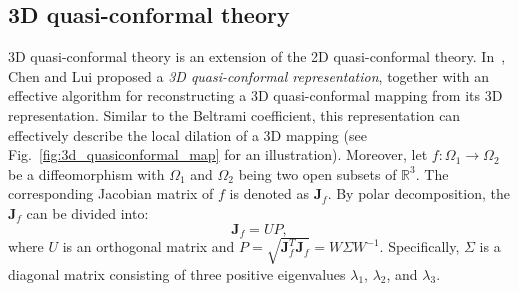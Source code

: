 \documentclass{article}
\begin{document}
\subsection{3D quasi-conformal theory}\label{ssec:3d-quasi-conformal}
3D quasi-conformal theory is an extension of the 2D quasi-conformal theory. In~\cite{chen2024novel3dmappingrepresentation}, Chen and Lui proposed a \textit{3D quasi-conformal representation}, together with an effective algorithm for reconstructing a 3D quasi-conformal mapping from its 3D representation. Similar to the Beltrami coefficient, this representation can effectively describe the local dilation of a 
3D mapping (see Fig.~\ref{fig:3d_quasiconformal_map} for an illustration). Moreover, let $f:\Omega_1 \rightarrow \Omega_2$ be a diffeomorphism with $\Omega_1$ and $\Omega_2$ being two open subsets of $\mathbb{R}^3$. The corresponding Jacobian matrix of $f$ is denoted as $\mathbf{J}_f$. By polar decomposition, the $\mathbf{J}_f$ can be divided into:
\begin{equation}\label{eqt:decomposition}
    \mathbf{J}_f = UP,
\end{equation}
where $U$ is an orthogonal matrix and $P = \sqrt{\mathbf{J}^T_f\mathbf{J}_f} = W\Sigma W^{-1}$. Specifically, $\Sigma$ is a diagonal matrix consisting of three positive eigenvalues $\lambda_1$, $\lambda_2$, and $\lambda_3$.
\end{document}
